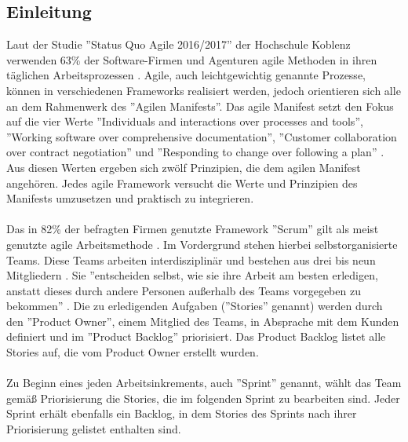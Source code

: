 \documentclass[12pt,titlepage]{scrartcl}
\begin{document}
		\subsection{Einleitung} \label{Einleitung}
		Laut der Studie ''Status Quo Agile 2016/2017'' der Hochschule Koblenz verwenden 63\% der Software-Firmen und Agenturen agile Methoden in ihren täglichen Arbeitsprozessen \cite{hskob}. Agile, auch leichtgewichtig genannte Prozesse, können in verschiedenen Frameworks realisiert werden, jedoch orientieren sich alle an dem Rahmenwerk des ''Agilen Manifests''. Das agile Manifest setzt den Fokus auf die vier Werte ''Individuals and interactions over processes and tools'', ''Working software over comprehensive documentation'', ''Customer collaboration over contract negotiation'' und ''Responding to change over following a plan'' \cite{manifest}. Aus diesen Werten ergeben sich zwölf Prinzipien, die dem agilen Manifest angehören. Jedes agile Framework versucht die Werte und Prinzipien des Manifests umzusetzen und praktisch zu integrieren. \\ \\
		Das in 82\% der befragten Firmen genutzte Framework ''Scrum'' gilt als meist genutzte agile Arbeitsmethode \cite{hskob}. Im Vordergrund stehen hierbei selbstorganisierte Teams. Diese Teams arbeiten interdisziplinär und bestehen aus drei bis neun Mitgliedern \cite{guide}. Sie ''entscheiden selbst, wie sie ihre Arbeit am besten erledigen, anstatt dieses durch andere Personen außerhalb des Teams vorgegeben zu bekommen'' \cite{guide}. Die zu erledigenden Aufgaben (''Stories'' genannt) werden durch den ''Product Owner'', einem Mitglied des Teams, in Absprache mit dem Kunden definiert und im ''Product Backlog'' priorisiert. Das Product Backlog listet alle Stories auf, die vom Product Owner erstellt wurden.\\ \\
		Zu Beginn eines jeden Arbeitsinkrements, auch ''Sprint'' genannt, wählt das Team gemäß Priorisierung die Stories, die im folgenden Sprint zu bearbeiten sind. Jeder Sprint erhält ebenfalls ein Backlog, in dem Stories des Sprints nach ihrer Priorisierung gelistet enthalten sind. \\ 
\end{document}
